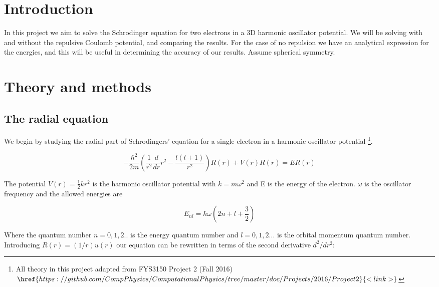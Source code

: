 \documentclass[%
 reprint,
 nobalancelastpage,
 amsmath,amssymb,
 aps,
]{revtex4-1}
\newcommand{\hbarm}{-\frac{\hbar^{2}}{2m}}
\newcommand{\ortwo}{\frac{1}{r^{2}}}
\newcommand{\ddr}{\frac{d}{dr}}
\newcommand{\onehalf}{\frac{1}{2}}
\begin{document}

\maketitle

\section{\label{sec:Int}Introduction}
In this project we aim to solve the Schrodinger equation for two electrons in a 3D harmonic oscillator potential. We will be solving with and without the repulsive Coulomb potential, and comparing the results. For the case of no repulsion we have an analytical expression for the energies, and this will be useful in determining the accuracy of our results. Assume spherical symmetry.

\section{\label{sec:The}Theory and methods}

\subsection{\label{sec:Rad}The radial equation}
We begin by studying the radial part of Schrodingers' equation for a single electron in a harmonic oscillator potential \footnote{All theory in this project adapted from FYS3150 Project 2 (Fall 2016) $\href{https://github.com/CompPhysics/ComputationalPhysics/tree/master/doc/Projects/2016/Project2}{<link>}$}.

\begin{equation}
	\hbarm	(\ortwo \ddr r^{2} - \frac{l(l+1)}{r^{2}}) R(r) + V(r)R(r) = E R(r)
\end{equation}

The potential $V(r) = \onehalf kr^{2}$ is the harmonic oscillator potential with $k = m\omega^{2}$ and E is the energy of the electron. $\omega$ is the oscillator frequency and the allowed energies are

\begin{equation}
	E_{nl} = \hbar \omega (2n+l+\frac{3}{2})
\end{equation}

Where the quantum number $n = 0,1,2..$ is the energy quantum number and $l = 0,1,2...$ is the orbital momentum quantum number. Introducing $R(r) = (1/r)u(r)$ our equation can be rewritten in terms of the second derivative $d^{2}/dr^{2}$:
\end{document}
